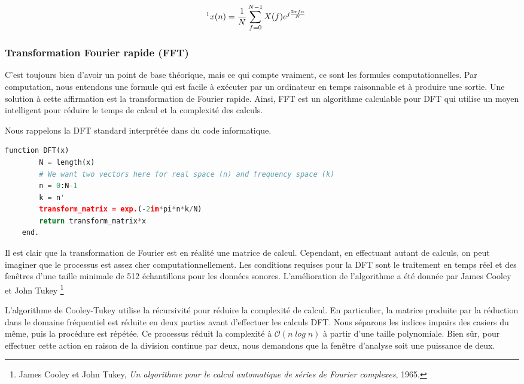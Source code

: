 \begin{equation}
\footnote{Alan V. Oppenheim et Ronald W. Schafer. Discrete-time signal processingd. Prentice Hall Press.}
    x(n) = \frac{1}{N} \sum_{ f = 0} ^ {N-1} X(f) e ^ {j \frac{2 \pi f n}{N}} \hspace{5mm} 
\end{equation}

    \subsubsection{Transformation Fourier rapide (FFT)}

C'est toujours bien d'avoir un point de base théorique, mais ce qui compte vraiment, ce sont les formules computationnelles. Par computation, nous entendons une formule qui est facile à exécuter par un ordinateur en temps raisonnable et à produire une sortie. Une solution à cette affirmation est la transformation de Fourier rapide. Ainsi, FFT est un algorithme calculable pour DFT qui utilise un moyen intelligent pour réduire le temps de calcul et la complexité des calculs.

Nous rappelons la DFT standard interprétée dans du code informatique.

\noindent\begin{minipage}{\textwidth}
    \begin{lstlisting}[language=Python, caption= DFT]
    function DFT(x)
        N = length(x)
        # We want two vectors here for real space (n) and frequency space (k)
        n = 0:N-1
        k = n'
        transform_matrix = exp.(-2im*pi*n*k/N)
        return transform_matrix*x
    end.
    \end{lstlisting}
\end{minipage}

Il est clair que la transformation de Fourier est en réalité une matrice de calcul. Cependant, en effectuant autant de calculs, on peut imaginer que le processus est assez cher computationnellement. Les conditions requises pour la DFT sont le traitement en temps réel et des fenêtres d’une taille minimale de 512 échantillons pour les données sonores. L'amélioration de l'algorithme a été donnée par James Cooley et John Tukey \footnote{James Cooley et John Tukey, \textit{Un algorithme pour le calcul automatique de séries de Fourier complexes}, 1965. \nocite{Fourier_complex}}
 
L'algorithme de Cooley-Tukey utilise la récursivité pour réduire la complexité de calcul. En particulier, la matrice produite par la réduction dans le domaine fréquentiel est réduite en deux parties avant d'effectuer les calculs DFT. Nous séparons les indices impairs des casiers du même, puis la procédure est répétée. Ce processus réduit la complexité à $ \mathcal{O} (n \; log \; n) $ à partir d’une taille polynomiale. Bien sûr, pour effectuer cette action en raison de la division continue par deux, nous demandons que la fenêtre d’analyse soit une puissance de deux.

